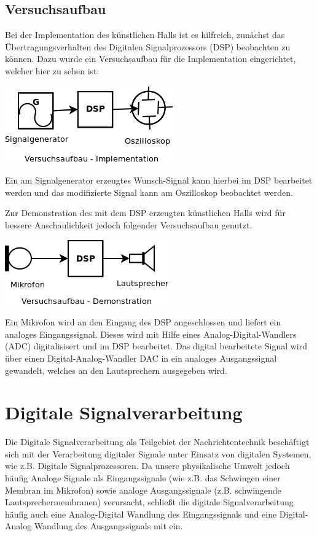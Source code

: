 \documentclass[a4paper,12pt,fontsize=12,DIV=12]{scrartcl}
\begin{document}
\subsection{Versuchsaufbau}
Bei der Implementation des künstlichen Halls ist es hilfreich, zunächst das Übertragungsverhalten des Digitalen Signalprozessors (DSP) beobachten zu können. Dazu wurde ein Versuchsaufbau für die Implementation eingerichtet, welcher hier zu sehen ist:
\begin{center}
\includegraphics[scale=0.8]{Bilder/Versuchsaufbau_Implementation.png}
\end{center}
Ein am Signalgenerator erzeugtes Wunsch-Signal kann hierbei im DSP bearbeitet werden und das modifizierte Signal kann am Oszilloskop beobachtet werden.

Zur Demonstration des mit dem DSP erzeugten künstlichen Halls wird für bessere Anschaulichkeit jedoch folgender Versuchsaufbau genutzt.
\begin{center}
	\includegraphics[scale=0.8]{Bilder/Versuchsaufbau_Demonstration.png}
\end{center}
%
%
Ein Mikrofon wird an den Eingang des DSP angeschlossen und liefert ein analoges Eingangssignal. Dieses wird mit Hilfe eines Analog-Digital-Wandlers (ADC) digitalisisert und im DSP bearbeitet. Das digital bearbeitete Signal wird über einen Digital-Analog-Wandler DAC in ein analoges Ausgangssignal gewandelt, welches an den Lautsprechern ausgegeben wird.


\section{Digitale Signalverarbeitung}
Die Digitale Signalverarbeitung als Teilgebiet der Nachrichtentechnik beschäftigt sich mit der Verarbeitung digitaler Signale unter Einsatz von digitalen Systemen, wie z.B. Digitale Signalprozessoren.
Da unsere physikalische Umwelt jedoch häufig Analoge Signale als Eingangssignale (wie z.B. das Schwingen einer Membran im Mikrofon) sowie analoge Ausgangssignale (z.B. schwingende Lautsprechermembranen) verursacht, schließt die digitale Signalverarbeitung häufig auch eine Analog-Digital Wandlung des Eingangssignals und eine Digital-Analog Wandlung des Ausgangssignals mit ein.
\end{document}
